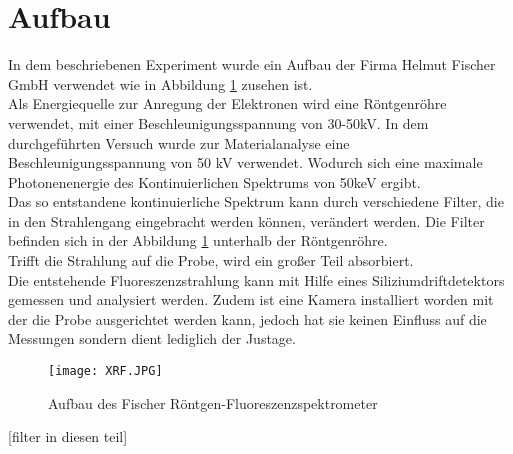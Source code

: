 \section{Aufbau}
In dem beschriebenen Experiment wurde ein Aufbau der Firma Helmut Fischer GmbH verwendet wie in Abbildung \ref{fig:Aufbau} zusehen ist.\\
Als Energiequelle zur Anregung der Elektronen wird eine Röntgenröhre verwendet, mit einer Beschleunigungsspannung von 30-50kV. In dem durchgeführten Versuch wurde zur Materialanalyse eine Beschleunigungsspannung von 50 kV verwendet. Wodurch sich eine maximale Photonenenergie des Kontinuierlichen Spektrums von 50keV ergibt. \\
Das so entstandene kontinuierliche Spektrum kann durch verschiedene Filter, die in den Strahlengang eingebracht werden können, verändert werden. Die Filter befinden sich in der Abbildung \ref{fig:Aufbau} unterhalb der Röntgenröhre.\\
Trifft die Strahlung auf die Probe, wird ein großer Teil absorbiert.\\
Die entstehende Fluoreszenzstrahlung kann mit Hilfe eines Siliziumdriftdetektors gemessen und analysiert werden.
Zudem ist eine Kamera installiert worden mit der die Probe ausgerichtet werden kann, jedoch hat sie keinen Einfluss auf die Messungen sondern dient lediglich der Justage.\\
\begin{figure}[h]
 \centering
 \texttt{[image: XRF.JPG]}
 \caption[Fischer XRF]{Aufbau des Fischer Röntgen-Fluoreszenzspektrometer \cite{bib:Aufbau}}
 \label{fig:Aufbau}
\end{figure}
[filter in diesen teil]